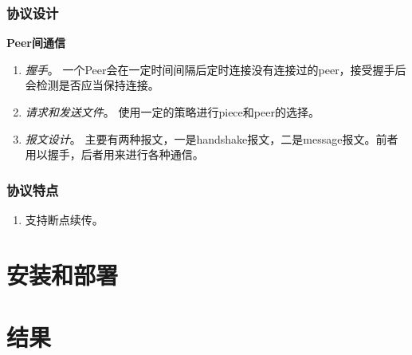 \documentclass[15pt]{ctexart}
\begin{document}
		\subsubsection{协议设计} %
		\label{ssub:协议设计}
			\noindent \textbf{Peer间通信}\\
			\begin{enumerate}
				\item \emph{握手}。
				一个Peer会在一定时间间隔后定时连接没有连接过的peer，接受握手后会检测是否应当保持连接。
				\item \emph{请求和发送文件}。
				使用一定的策略进行piece和peer的选择。
				\item \emph{报文设计}。
				主要有两种报文，一是handshake报文，二是message报文。前者用以握手，后者用来进行各种通信。
			\end{enumerate}
		\subsubsection{协议特点} %
		\label{ssub:协议特点}
			\begin{enumerate}
				\item 支持断点续传。
			\end{enumerate}
	


\section{安装和部署} %
\label{sec:安装和部署}


\section{结果} %
\label{sec:结果}
\end{document}
